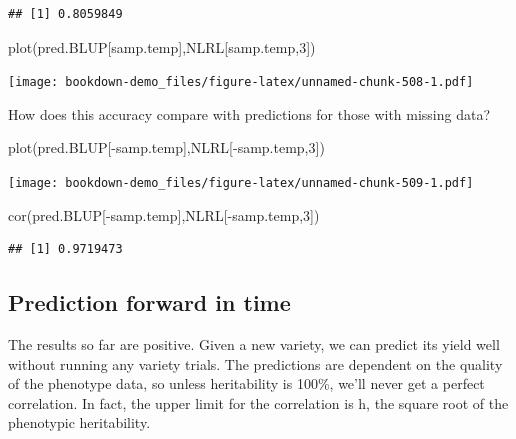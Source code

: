 \documentclass[
]{book}
\newenvironment{Shaded}{\begin{snugshade}}{\end{snugshade}}
\newcommand{\DecValTok}[1]{\textcolor[rgb]{0.00,0.00,0.81}{#1}}
\newcommand{\FunctionTok}[1]{\textcolor[rgb]{0.00,0.00,0.00}{#1}}
\newcommand{\NormalTok}[1]{#1}
\newcommand{\SpecialCharTok}[1]{\textcolor[rgb]{0.00,0.00,0.00}{#1}}
\begin{document}
\begin{verbatim}
## [1] 0.8059849
\end{verbatim}

\begin{Shaded}
\begin{Highlighting}[]
\FunctionTok{plot}\NormalTok{(pred.BLUP[samp.temp],NLRL[samp.temp,}\DecValTok{3}\NormalTok{])}
\end{Highlighting}
\end{Shaded}

\texttt{[image: bookdown-demo\_files/figure-latex/unnamed-chunk-508-1.pdf]}

How does this accuracy compare with predictions for those with missing data?

\begin{Shaded}
\begin{Highlighting}[]
\FunctionTok{plot}\NormalTok{(pred.BLUP[}\SpecialCharTok{{-}}\NormalTok{samp.temp],NLRL[}\SpecialCharTok{{-}}\NormalTok{samp.temp,}\DecValTok{3}\NormalTok{])}
\end{Highlighting}
\end{Shaded}

\texttt{[image: bookdown-demo\_files/figure-latex/unnamed-chunk-509-1.pdf]}

\begin{Shaded}
\begin{Highlighting}[]
\FunctionTok{cor}\NormalTok{(pred.BLUP[}\SpecialCharTok{{-}}\NormalTok{samp.temp],NLRL[}\SpecialCharTok{{-}}\NormalTok{samp.temp,}\DecValTok{3}\NormalTok{])}
\end{Highlighting}
\end{Shaded}

\begin{verbatim}
## [1] 0.9719473
\end{verbatim}

\hypertarget{prediction-forward-in-time}{%
\subsection{Prediction forward in time}\label{prediction-forward-in-time}}

The results so far are positive. Given a new variety, we can predict its yield well without running any variety trials. The predictions are dependent on the quality of the phenotype data, so unless heritability is 100\%, we'll never get a perfect correlation. In fact, the upper limit for the correlation is h, the square root of the phenotypic heritability.
\end{document}
